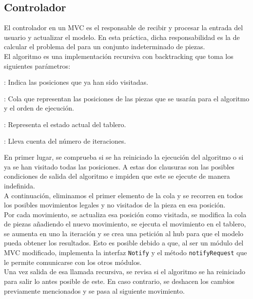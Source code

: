 \subsection{Controlador}
El controlador en un MVC es el responsable de recibir y procesar la entrada del usuario y actualizar el modelo. En esta práctica, dicha responsabilidad es la de calcular el problema del \cite{schwenk1994knight} para un conjunto indeterminado de piezas.\\

El algoritmo es una implementación recursiva con backtracking que toma los siguientes parámetros:\medskip

\begin{description}[leftmargin=0pt]
\item[visitedTowns]: Indica las posiciones que ya han sido visitadas.
\item[pieces]: Cola que representan las posiciones de las piezas que se usarán para el algoritmo y el orden de ejecución.
\item[board]: Representa el estado actual del tablero.
\item[iteration]: Lleva cuenta del número de iteraciones.
\end{description}
\medskip

En primer lugar, se comprueba si se ha reiniciado la ejecución del algoritmo o si ya se han visitado todas las posiciones. A estas dos clausuras son las posibles condiciones de salida del algoritmo e impiden que este se ejecute de manera indefinida. \\

A continuación, eliminamos el primer elemento de la cola y se recorren en todos los posibles movimientos legales y no visitados de la pieza en esa posición. \\

Por cada movimiento, se actualiza esa posición como visitada, se modifica la cola de piezas añadiendo el nuevo movimiento, se ejecuta el movimiento en el tablero, se aumenta en uno la iteración y se crea una petición al hub para que el modelo pueda obtener los resultados. Esto es posible debido a que, al ser un módulo del MVC modificado, implementa la interfaz \texttt{Notify} y el método \texttt{notifyRequest} que le permite comunicarse con los otros módulos. \\

Una vez salida de esa llamada recursiva, se revisa si el algoritmo se ha reiniciado para salir lo antes posible de este. En caso contrario, se deshacen los cambios previamente mencionados y se pasa al siguiente movimiento. \\

